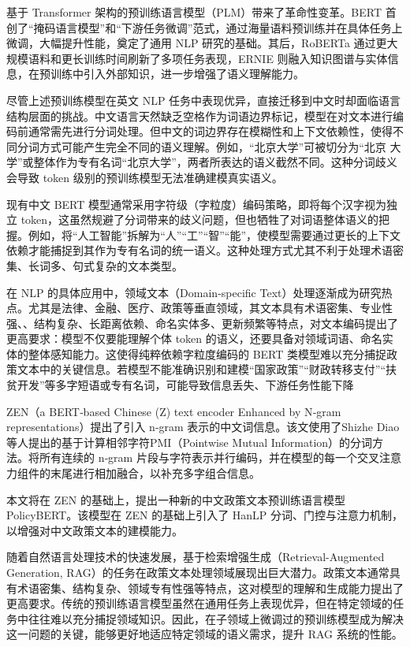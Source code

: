 \documentclass[12pt, a4paper]{ctexart}
\begin{document}
基于 Transformer 架构的预训练语言模型（PLM）带来了革命性变革。BERT 首创了“掩码语言模型”和“下游任务微调”范式，通过海量语料预训练并在具体任务上微调，大幅提升性能，奠定了通用 NLP 研究的基础\cite{devlin-etal-2019-bert}。其后，RoBERTa 通过更大规模语料和更长训练时间刷新了多项任务表现\cite{liu2019robertarobustlyoptimizedbert}，ERNIE 则融入知识图谱与实体信息，在预训练中引入外部知识，进一步增强了语义理解能力\cite{sun2019ernieenhancedrepresentationknowledge}。

尽管上述预训练模型在英文 NLP 任务中表现优异，直接迁移到中文时却面临语言结构层面的挑战。中文语言天然缺乏空格作为词语边界标记，模型在对文本进行编码前通常需先进行分词处理。但中文的词边界存在模糊性和上下文依赖性，使得不同分词方式可能产生完全不同的语义理解。例如，“北京大学”可被切分为“北京 大学”或整体作为专有名词“北京大学”，两者所表达的语义截然不同。这种分词歧义会导致 token 级别的预训练模型无法准确建模真实语义。

现有中文 BERT 模型通常采用字符级（字粒度）编码策略，即将每个汉字视为独立 token，这虽然规避了分词带来的歧义问题，但也牺牲了对词语整体语义的把握。例如，将“人工智能”拆解为“人”“工”“智”“能”，使模型需要通过更长的上下文依赖才能捕捉到其作为专有名词的统一语义。这种处理方式尤其不利于处理术语密集、长词多、句式复杂的文本类型。

在 NLP 的具体应用中，领域文本（Domain-specific Text）处理逐渐成为研究热点。尤其是法律、金融、医疗、政策等垂直领域，其文本具有术语密集、专业性强、、结构复杂、长距离依赖、命名实体多、更新频繁等特点，对文本编码提出了更高要求：模型不仅要能理解个体 token 的语义，还要具备对领域词语、命名实体的整体感知能力。这使得纯粹依赖字粒度编码的 BERT 类模型难以充分捕捉政策文本中的关键信息。若模型不能准确识别和建模“国家政策”“财政转移支付”“扶贫开发”等多字短语或专有名词，可能导致信息丢失、下游任务性能下降

ZEN（a BERT‑based Chinese (Z) text encoder Enhanced by N‑gram representations）提出了引入 n‑gram 表示的中文词信息\cite{diao-etal-2020-zen}。该文使用了Shizhe Diao 等人提出的基于计算相邻字符PMI（Pointwise Mutual Information）的分词方法\cite{DXSJSZ2021}。将所有连续的 n‑gram 片段与字符表示并行编码，并在模型的每一个交叉注意力组件的末尾进行相加融合，以补充多字组合信息。

本文将在 ZEN 的基础上，提出一种新的中文政策文本预训练语言模型 PolicyBERT。该模型在 ZEN 的基础上引入了 HanLP 分词、门控与注意力机制，以增强对中文政策文本的建模能力。

\vspace{2em} %

随着自然语言处理技术的快速发展，基于检索增强生成（Retrieval-Augmented Generation, RAG）的任务在政策文本处理领域展现出巨大潜力。政策文本通常具有术语密集、结构复杂、领域专有性强等特点，这对模型的理解和生成能力提出了更高要求。传统的预训练语言模型虽然在通用任务上表现优异，但在特定领域的任务中往往难以充分捕捉领域知识。因此，在子领域上微调过的预训练模型成为解决这一问题的关键，能够更好地适应特定领域的语义需求，提升 RAG 系统的性能。
\end{document}
